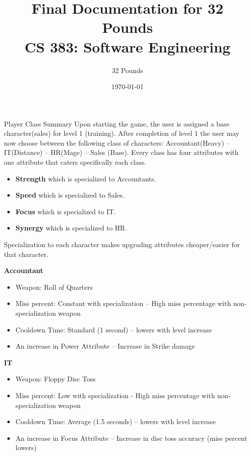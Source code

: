 \documentclass[12pt]{report}
\begin{document}
\title{Final Documentation for 32 Pounds\\ \vspace{2 mm} {\large CS 383: Software Engineering}}

\author{32 Pounds}
\date{\today}
\maketitle
\clearpage

\begin{chapter}{Player Class Summary}
 Upon starting the game, the user is assigned a base character(sales) for level 1 (training). After completion of level 1 the user may now choose between the following class of characters: Accountant(Heavy) -- IT(Distance) -- HR(Mage) -- Sales (Base).  Every class has four attributes with one attribute that caters specifically each class. 
	\begin{itemize}
	 \item \textbf{Strength} which is specialized to Accountants.
	 \item \textbf{Speed} which is specialized to Sales.
	 \item \textbf{Focus} which is specialized to IT.
	 \item \textbf{Synergy} which is specialized to HR.  
	\end{itemize}
	Specialization to each character makes upgrading attributes cheaper/easier for that character.

	\textbf{\large{Accountant}}
	\begin{itemize}
  	 \item Weapon: Roll of Quarters
	 \item Miss percent: Constant with specialization -- High miss percentage with non-specialization weapon
  	 \item Cooldown Time: Standard (1 second) -- lowers with level increase %
  	 \item An increase in Power Attribute -- Increase in Strike damage 
	\end{itemize}

	\textbf{\large{IT}} 
	\begin{itemize}
  	 \item Weapon: Floppy Disc Toss
  	 \item Miss percent: Low with specialization - High miss percentage with non-specialization weapon
  	 \item Cooldown Time: Average (1.5 seconds) -- lowers with level increase
         \item An increase in Focus Attribute -- Increase in disc toss accuracy (miss percent lowers)
	\end{itemize}


\end{chapter}
\end{document}
